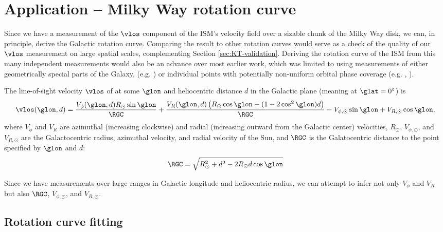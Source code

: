 \section{Application -- Milky Way rotation curve}
\label{sec:rotation_curve}

Since we have a measurement of the $\vlos$ component of the ISM's velocity field over a sizable chunk of the Milky Way disk, we can, in principle, derive the Galactic rotation curve.
Comparing the result to other rotation curves would serve as a check of the quality of our $\vlos$ measurement on large spatial scales, complementing Section \ref{sec:KT-validation}.
Deriving the rotation curve of the ISM from this many independent measurements would also be an advance over most earlier work, which was limited to using measurements of either geometrically special parts of the Galaxy, (e.g. \Clemens) or individual points with potentially non-uniform orbital phase coverage (e.g. \citealt{Reid:2009jb}, \Reid). 

The line-of-sight velocity $\vlos$ of at some $\glon$ and heliocentric distance $d$ in the Galactic plane (meaning at $\glat=0^\circ$) is 
\begin{equation}
\label{eqn:vlos_complete}
\vlos(\glon, d) = \frac{V_\phi (\glon, d) R_\odot \sin\glon}{\RGC} + 
\frac{V_R (\glon, d) \left(R_\odot \cos \glon + (1 - 2 \cos^2 \glon) d  \right) }{\RGC} - V_{\phi, \odot} \sin \glon + V_{R, \odot} \cos \glon,
\end{equation}
where $V_\phi$ and $V_R$ are azimuthal (increasing clockwise) and radial (increasing outward from the Galactic center) velocities, $R_\odot$, $V_{\phi, \odot}$, and $V_{R, \odot}$ are the Galactocentric radius, azimuthal velocity, and radial velocity of the Sun, and $\RGC$ is the Galatocentric distance to the point specified by $\glon$ and $d$:
\begin{equation}
\RGC = \sqrt{R^2_\odot + d^2 - 2 R_\odot d \cos \glon}
\end{equation}

Since we have measurements over large ranges in Galactic longitude and heliocentric radius, we can attempt to infer not only $V_\phi$ and $V_R$ but also $\RGC$, $V_{\phi, \odot}$, and $V_{R, \odot}$.

\subsection{Rotation curve fitting}

